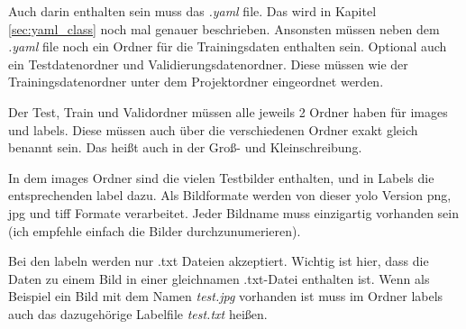 Auch darin enthalten sein muss das \textit{.yaml} file. Das wird in Kapitel \ref{sec:yaml_class} noch mal genauer beschrieben. Ansonsten müssen neben dem \textit{.yaml} file noch ein Ordner für die Trainingsdaten enthalten sein. Optional auch ein Testdatenordner und Validierungsdatenordner. Diese müssen wie der Trainingsdatenordner unter dem Projektordner eingeordnet werden.

Der Test, Train und Validordner müssen alle jeweils 2 Ordner haben für images und labels. Diese müssen auch über die verschiedenen Ordner exakt gleich benannt sein. Das heißt auch in der Groß- und Kleinschreibung. 

In dem images Ordner sind die vielen Testbilder enthalten, und in Labels die entsprechenden label dazu. Als Bildformate werden von dieser \ac{yolo} Version png, jpg und tiff Formate verarbeitet. Jeder Bildname muss einzigartig vorhanden sein (ich empfehle einfach die Bilder durchzunumerieren).

Bei den labeln werden nur .txt Dateien akzeptiert. Wichtig ist hier, dass die Daten zu einem Bild in einer gleichnamen .txt-Datei enthalten ist. Wenn als Beispiel ein Bild mit dem Namen \textit{test.jpg} vorhanden ist muss im Ordner labels auch das dazugehörige Labelfile \textit{test.txt} heißen.

